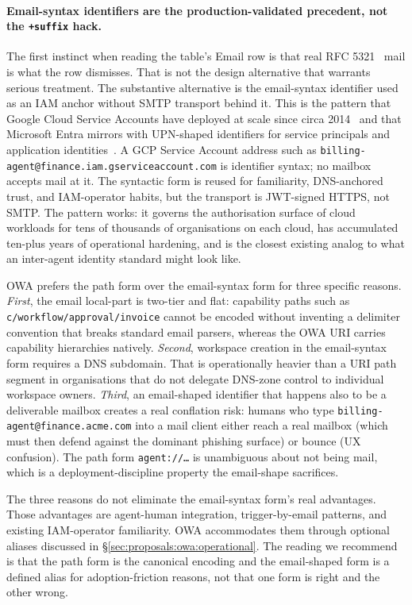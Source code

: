 \paragraph{Email-syntax identifiers are the production-validated
precedent, not the \texttt{+suffix} hack.}
The first instinct when reading the table's Email row is
that real RFC 5321~\cite{rfc5321} mail is what the row
dismisses. That is
not the design alternative that warrants serious treatment.
The substantive alternative is the email-syntax identifier
used as an IAM anchor without SMTP transport behind it.
This is the pattern that Google Cloud Service Accounts have
deployed at scale since circa 2014~\cite{gcp_service_accounts}
and that Microsoft Entra mirrors with UPN-shaped
identifiers for service principals and application
identities~\cite{entra_service_principals}. A GCP Service
Account address such as \texttt{billing-agent@finance.iam.gserviceaccount.com}
is identifier syntax; no mailbox accepts mail at it. The
syntactic form is reused for familiarity, DNS-anchored trust,
and IAM-operator habits, but the transport is JWT-signed
HTTPS, not SMTP. The pattern works: it governs the
authorisation surface of cloud workloads for tens of
thousands of organisations on each cloud, has accumulated
ten-plus years of operational hardening, and is the closest
existing analog to what an inter-agent identity standard
might look like.

OWA prefers the path form over the email-syntax form for
three specific reasons. \emph{First}, the email
local-part is two-tier and flat: capability paths such
as \texttt{c/workflow/approval/invoice} cannot be encoded
without inventing a delimiter convention that breaks
standard email parsers, whereas the OWA URI carries
capability hierarchies natively. \emph{Second}, workspace
creation in the email-syntax form requires a DNS
subdomain. That is operationally heavier than a URI path
segment in organisations that do not delegate DNS-zone
control to individual workspace owners. \emph{Third}, an
email-shaped identifier that happens also to be a
deliverable mailbox creates a real conflation risk:
humans who type \texttt{billing-agent@finance.acme.com}
into a mail client either reach a real mailbox (which
must then defend against the dominant phishing surface)
or bounce (UX confusion). The path form
\texttt{agent://\ldots} is unambiguous about not being
mail, which is a deployment-discipline property the
email-shape sacrifices.

The three reasons do not eliminate the email-syntax form's
real advantages. Those advantages are agent-human
integration, trigger-by-email patterns, and existing
IAM-operator familiarity. OWA accommodates them
through optional aliases discussed in
\S\ref{sec:proposals:owa:operational}. The reading we
recommend is that the path form is the canonical
encoding and the email-shaped form is a defined alias for
adoption-friction reasons, not that one form is right and
the other wrong.

